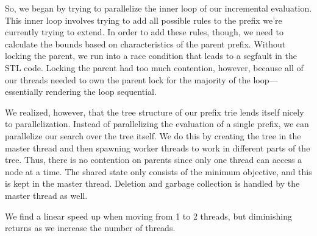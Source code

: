 So, we began by trying to parallelize the inner loop of our incremental evaluation.
This inner loop involves trying to add all possible rules to the prefix we're currently trying to extend.
In order to add these rules, though, we need to calculate the bounds based on characteristics of the parent prefix.
Without locking the parent, we run into a race condition that leads to a segfault in the STL code.
Locking the parent had too much contention, however, because all of our threads needed to own the parent lock for the majority of the loop---essentially rendering the loop sequential.

We realized, however, that the tree structure of our prefix trie lends itself nicely to parallelization.
Instead of parallelizing the evaluation of a single prefix, we can parallelize our search over the tree itself.
We do this by creating the tree in the master thread and then spawning worker threads to work in different parts of the tree.
Thus, there is no contention on parents since only one thread can access a node at a time.
The shared state only consists of the minimum objective, and this is kept in the master thread.
Deletion and garbage collection is handled by the master thread as well.

We find a linear speed up when moving from 1 to 2 threads, but diminishing returns as we increase the number of threads.